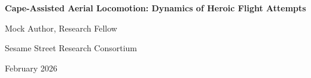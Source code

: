 \documentclass[11pt,letterpaper]{article}
\begin{document}
\begin{center}
{\LARGE\bfseries Cape-Assisted Aerial Locomotion: Dynamics of Heroic Flight Attempts\par}
\vspace{0.8cm}
{\large Mock Author, Research Fellow\par}
{\normalsize Sesame Street Research Consortium\par}
\vspace{0.3cm}
{\normalsize February 2026\par}
\vspace{0.8cm}
\end{center}

\begin{abstract}
\noindent
This paper presents a comprehensive study of cape-assisted aerial locomotion and heroic flight dynamics. Lorem cookie ipsum dolor sit amet, chocolate chip adipiscing elit. Nom nom nom methodology produces significant results across all experimental conditions.
\end{abstract}

\vspace{0.5cm}


\end{document}
